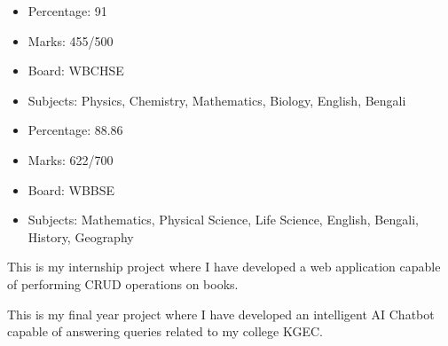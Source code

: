 \documentclass[10pt,legalpaper,ragged2e,withhyper]{altacv}
\begin{document}
\begin{paracol}{2}
    \begin{minipage}[t]{0.2\textwidth}
        \begin{itemize}
            \item Percentage: 91
            \item Marks: 455/500
        \end{itemize}
    \end{minipage}
    \begin{minipage}[t]{0.4\textwidth}
        \begin{itemize}
            \item Board: WBCHSE
            \item Subjects: Physics, Chemistry, Mathematics, Biology, English, Bengali
        \end{itemize}
    \end{minipage}

    \divider
    \begin{minipage}[t]{0.2\textwidth}
        \begin{itemize}
            \item Percentage: 88.86
            \item Marks: 622/700
        \end{itemize}
    \end{minipage}
    \begin{minipage}[t]{0.4\textwidth}
        \begin{itemize}
            \item Board: WBBSE
            \item Subjects: Mathematics, Physical Science, Life Science, English, Bengali, History, Geography
        \end{itemize}
    \end{minipage}


    This is my internship project where I have developed a web application capable of performing CRUD operations on books.
    \divider

    This is my final year project where I have developed an intelligent AI Chatbot capable of answering queries related to my college KGEC.

\end{paracol}
\end{document}
